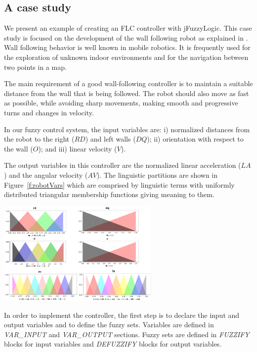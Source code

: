 \documentclass[11pt,twoside]{article}
\begin{document}
\begin{multicols}{2}
\section{A case study\label{sec:cas}}

We present an example of creating an FLC controller with jFuzzyLogic. 
This case study is focused on the development of the wall following robot as explained in \cite{mucientes2009learning}. 
Wall following behavior is well known in mobile robotics. 
It is frequently used for the exploration of unknown indoor environments and for the navigation between two points in a map. 


The main requirement of a good wall-following controller is to maintain a suitable distance from the wall that is being followed. 
The robot should also move as fast as possible, while avoiding sharp movements, making smooth and progressive turns and changes in velocity.

In our fuzzy control system, the input variables are: 
	i) normalized distances from the robot to the right ($RD$) and left walls ($DQ$); 
	ii) orientation with respect to the wall ($O$); and 
	iii) linear velocity ($V$). 

The output variables in this controller are the normalized linear acceleration ($LA$) and the angular velocity ($AV$). 
The linguistic partitions are shown in Figure~\ref{f:robotVars} which are comprised by linguistic terms with uniformly distributed triangular membership functions giving meaning to them.

\vspace*{10pt}
\centerline{\includegraphics[width=3.1in]{./figs/robot_vars_2.png}}
\vspace*{10pt}
\label{f:robotVars}
\vspace*{10pt}

In order to implement the controller, the first step is to declare the input and output variables and to define the fuzzy sets. 
Variables are defined in \textit{VAR\_INPUT} and \textit{VAR\_OUTPUT} sections. 
Fuzzy sets are defined in \textit{FUZZIFY} blocks for input variables and \textit{DEFUZZIFY} blocks for output variables.


\end{multicols}
\end{document}
